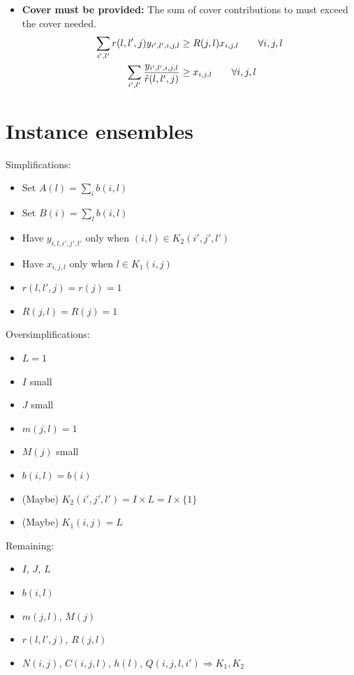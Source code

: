 \documentclass{article}
\begin{document}
\begin{itemize}
\item
\textbf{Cover must be provided:}
The sum of cover contributions to must exceed the cover needed.
\begin{align}
    \sum_{i', l'} r(l, l', j) y_{i', l', i, j, l} & \geq R(j, l) x_{i, j, l} \qquad \forall i, j, l \notag \\
    \sum_{i', l'} \frac{y_{i', l', i, j, l}}{\tilde r(l, l', j)} & \geq x_{i, j, l} \qquad \forall i, j, l \label{eqn:constraint_cover}
\end{align}
\end{itemize}

\section{Instance ensembles}
Simplifications:
\begin{itemize}
    \item Set $A(l) = \sum_{i} b(i, l)$
    \item Set $B(i) = \sum_{l} b(i, l)$
    \item Have $y_{i,l,i',j',l'}$ only when $(i, l) \in K_2(i', j', l')$
    \item Have $x_{i, j, l}$ only when $l \in K_1(i, j)$
    \item $r(l, l', j) = r(j) = 1$
    \item $R(j, l) = R(j) = 1$
\end{itemize}

\noindent
Oversimplifications:
\begin{itemize}
\item $L = 1$
\item $I$ small
\item $J$ small
\item $m(j, l) = 1$
\item $M(j)$ small 
\item $b(i, l) = b(i)$
\item (Maybe) $K_2(i', j', l') = I \times L = I \times \{1\}$
\item (Maybe) $K_1(i, j) = L$
\end{itemize}

\noindent
Remaining:
\begin{itemize}
\item $I$, $J$, $L$
\item $b(i, l)$
\item $m(j, l)$, $M(j)$
\item $r(l, l', j)$, $R(j, l)$
\item $N(i, j)$, $C(i, j, l)$, $h(l)$, $Q(i, j, l, i') \Rightarrow K_1, K_2$
\end{itemize}
\end{document}
